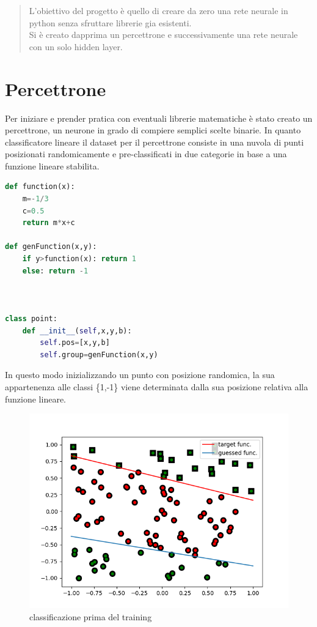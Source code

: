 \documentclass[12pt]{article}
\begin{document}
\begin{titlepage}
\end{titlepage}
\begin{abstract}
L'obiettivo del progetto è quello di creare da zero una rete neurale in python senza sfruttare librerie gia esistenti.
\\Si è creato dapprima un percettrone e successivamente una rete neurale con un solo hidden layer.
\end{abstract}
\section{Percettrone}
Per iniziare e prender pratica con eventuali librerie matematiche è stato creato un percettrone, un neurone in grado di compiere semplici scelte binarie.
In quanto classificatore lineare il dataset per il percettrone consiste in una nuvola di punti posizionati randomicamente e pre-classificati in due categorie in base a una funzione lineare stabilita.
\begin{lstlisting}[language=Python]
def function(x):
	m=-1/3
	c=0.5
	return m*x+c

def genFunction(x,y):
	if y>function(x): return 1
	else: return -1



class point:
    def __init__(self,x,y,b):
		self.pos=[x,y,b]
		self.group=genFunction(x,y)

\end{lstlisting}
In questo modo inizializzando un punto con posizione randomica, la sua appartenenza alle classi \{1,-1\} viene determinata dalla sua posizione relativa alla funzione lineare.
\newpage
\begin{figure}[h!]
	\centering
	\includegraphics[width=10 cm]{Perc_before.png}
	\caption{classificazione prima del training}
	\label{fig:percBefore}
\end{figure}
\end{document}
